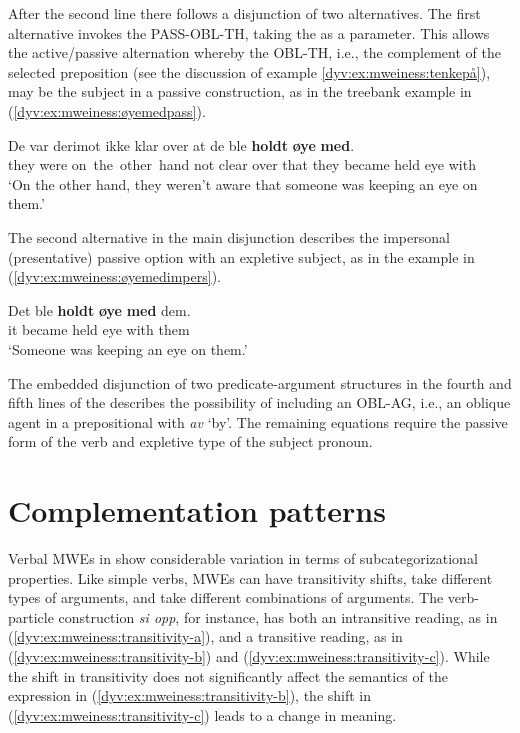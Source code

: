 \documentclass[output=paper]{langsci/langscibook}
\begin{document}
After the second line there follows a disjunction of two alternatives.
The first alternative invokes the  \textsf{PASS-OBL-TH}, taking the  as a parameter.
This  allows the active/passive alternation whereby the \textsf{OBL-TH}, i.e., the complement of the selected preposition (see the discussion of example \ref{dyv:ex:mweiness:tenkepå}), may be the subject in a passive construction, as in the treebank example in (\ref{dyv:ex:mweiness:øyemedpass}).

\ea\label{dyv:ex:mweiness:øyemedpass}
\gll De var derimot ikke klar over at de ble \textbf{holdt} \textbf{øye} \textbf{med}. \\
     they were on the other hand not clear over that they became held eye with\\
\glt `On the other hand, they weren't aware that someone was keeping an eye on them.'
\z

The second alternative in the main disjunction describes the impersonal (presentative) passive option with an expletive subject, as in the example in (\ref{dyv:ex:mweiness:øyemedimpers}).

\ea\label{dyv:ex:mweiness:øyemedimpers}
\gll Det ble \textbf{holdt} \textbf{øye} \textbf{med} dem. \\
     it became held eye with them\\
\glt `Someone was keeping an eye on them.'
\z

The embedded disjunction of two predicate-argument structures in the fourth and fifth lines of the  describes the possibility of including an \textsf{OBL-AG}, i.e., an oblique agent in a prepositional  with \textit{av} `by'.
The remaining equations require the passive form of the verb and expletive type of the subject pronoun.

\section{Complementation patterns}\label{dyv:sec:mweiness:complementation}

Verbal MWEs in  show considerable variation in terms of subcategorizational properties. 
Like simple verbs, MWEs can have transitivity shifts, take different types of arguments, and take different combinations of arguments. 
The verb-particle construction \emph{si opp}, for instance, has both an intransitive reading, as in (\ref{dyv:ex:mweiness:transitivity-a}), and a transitive reading, as in (\ref{dyv:ex:mweiness:transitivity-b}) and (\ref{dyv:ex:mweiness:transitivity-c}).
While the shift in transitivity does not significantly affect the semantics of the expression in (\ref{dyv:ex:mweiness:transitivity-b}), the shift in (\ref{dyv:ex:mweiness:transitivity-c}) leads to a change in meaning.  
\end{document}
